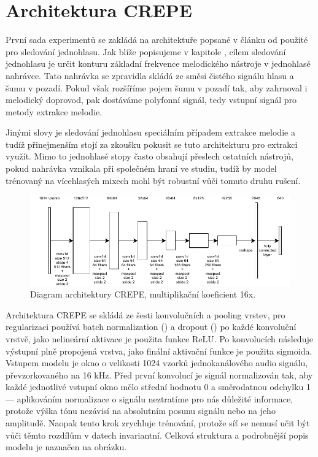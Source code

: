 \section{Architektura CREPE}\label{sec:crepe}

První sada experimentů se zakládá na architektuře popsané v článku od \cite{Kim2018} použité pro sledování jednohlasu. Jak blíže popisujeme v kapitole , cílem sledování jednohlasu je určit konturu základní frekvence melodického nástroje v jednohlasé nahrávce. Tato nahrávka se zpravidla skládá ze směsi čistého signálu hlasu a šumu v pozadí. Pokud však rozšíříme pojem šumu v pozadí tak, aby zahrnoval i melodický doprovod, pak dostáváme polyfonní signál, tedy vstupní signál pro metody extrakce melodie.

Jinými slovy je sledování jednohlasu speciálním případem extrakce melodie a tudíž přinejmenším stojí za zkoušku pokusit se tuto architekturu pro extrakci využít. Mimo to jednohlasé stopy často obsahují přeslech ostatních nástrojů, pokud nahrávka vznikala při společném hraní ve studiu, tudíž by model trénovaný na vícehlasých mixech mohl být robustní vůči tomuto druhu rušení. 

\begin{figure}[h]\centering
\includegraphics[width=\textwidth,height=\textheight,keepaspectratio]{../img/crepe_arch_grey}
\caption{Diagram architektury CREPE, multiplikační koeficient 16x.}
\label{obr:wavenet_dilated}
\end{figure}

Architektura CREPE se skládá ze šesti konvolučních a pooling vrstev, pro regularizaci používá batch normalization (\cite{Ioffe2015}) a dropout (\cite{Sutskever2014}) po každé konvoluční vrstvě, jako nelineární aktivace je použita funkce ReLU. Po konvolucích následuje výstupní plně propojená vrstva, jako finální aktivační funkce je použita sigmoida. Vstupem modelu je okno o velikosti 1024 vzorků jednokanálového audio signálu, převzorkovaného na 16 kHz. Před první konvolucí je signál normalizován tak, aby každé jednotlivé vstupní okno mělo střední hodnotu 0 a směrodatnou odchylku 1 --- aplikováním normalizace o signálu neztratíme pro nás důležité informace, protože výška tónu nezávisí na absolutním posunu signálu nebo na jeho amplitudě. Naopak tento krok zrychluje trénování, protože síť se nemusí učit být vůči těmto rozdílům v datech invariantní. Celková struktura a podrobnější popis modelu je naznačen na obrázku.


